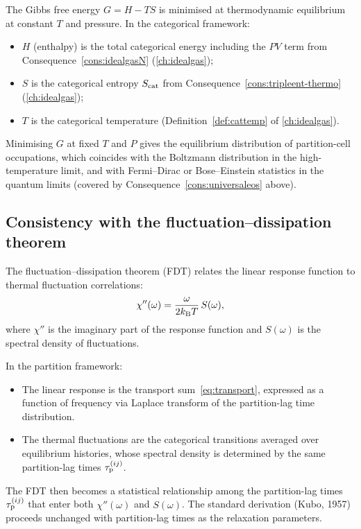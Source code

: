 The Gibbs free energy $G = H - TS$ is minimised at thermodynamic
equilibrium at constant $T$ and pressure.  In the categorical framework:
\begin{itemize}[nosep]
  \item $H$ (enthalpy) is the total categorical energy including the $PV$
    term from Consequence~\ref{cons:idealgasN} (\cref{ch:idealgas});
  \item $S$ is the categorical entropy $S_{\mathrm{cat}}$ from
    Consequence~\ref{cons:tripleent-thermo} (\cref{ch:idealgas});
  \item $T$ is the categorical temperature (Definition~\ref{def:cattemp}
    of \cref{ch:idealgas}).
\end{itemize}
Minimising $G$ at fixed $T$ and $P$ gives the equilibrium distribution of
partition-cell occupations, which coincides with the Boltzmann
distribution in the high-temperature limit, and with Fermi--Dirac or
Bose--Einstein statistics in the quantum limits (covered by
Consequence~\ref{cons:universaleos} above).

\subsection{Consistency with the fluctuation--dissipation theorem}

The fluctuation--dissipation theorem (FDT) relates the linear response
function to thermal fluctuation correlations:
\[
  \chi''(\omega)
  = \frac{\omega}{2k_{\mathrm{B}} T}\,S(\omega),
\]
where $\chi''$ is the imaginary part of the response function and $S(\omega)$
is the spectral density of fluctuations.

In the partition framework:
\begin{itemize}[nosep]
  \item The linear response is the transport sum~\eqref{eq:transport},
    expressed as a function of frequency via Laplace transform of the
    partition-lag time distribution.
  \item The thermal fluctuations are the categorical transitions averaged
    over equilibrium histories, whose spectral density is determined by
    the same partition-lag times $\tau_{\mathrm{p}}^{(ij)}$.
\end{itemize}
The FDT then becomes a statistical relationship among the partition-lag
times $\tau_{\mathrm{p}}^{(ij)}$ that enter both $\chi''(\omega)$ and $S(\omega)$.
The standard derivation (Kubo, 1957) proceeds unchanged with
partition-lag times as the relaxation parameters.

